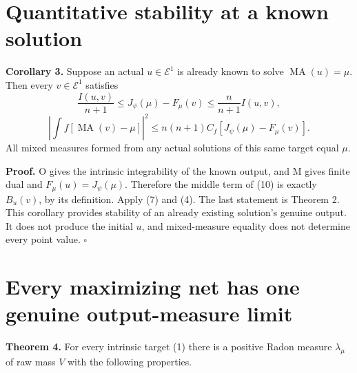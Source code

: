 \documentclass[
  11pt,
]{article}
\begin{document}
\section{Quantitative stability at a known
solution}\label{quantitative-stability-at-a-known-solution}

\textbf{Corollary 3.} Suppose an actual \(u\in\mathcal E^1\) is already
known to solve \(\operatorname{MA}(u)=\mu\). Then every
\(v\in\mathcal E^1\) satisfies \[
 \frac{I(u,v)}{n+1}\leq J_\psi(\mu)-F_\mu(v)
                   \leq\frac{n}{n+1}I(u,v),                   \tag{10}
\] \[
 \left|\int f[\operatorname{MA}(v)-\mu]\right|^2
       \leq n(n+1)C_f[J_\psi(\mu)-F_\mu(v)].                  \tag{11}
\] All mixed measures formed from any actual solutions of this same
target equal \(\mu\).

\textbf{Proof.} O gives the intrinsic integrability of the known output,
and M gives finite dual and \(F_\mu(u)=J_\psi(\mu)\). Therefore the
middle term of (10) is exactly \(B_u(v)\), by its definition. Apply (7)
and (4). The last statement is Theorem 2. This corollary provides
stability of an already existing solution's genuine output. It does not
produce the initial \(u\), and mixed-measure equality does not determine
every point value. \(\square\)

\section{Every maximizing net has one genuine output-measure
limit}\label{every-maximizing-net-has-one-genuine-output-measure-limit}

\textbf{Theorem 4.} For every intrinsic target (1) there is a positive
Radon measure \(\lambda_\mu\) of raw mass \(V\) with the following
properties.
\end{document}
